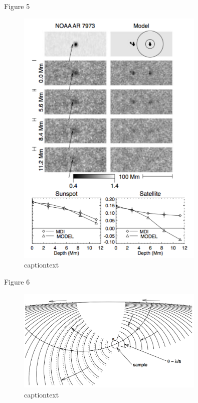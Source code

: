 \documentclass{beamer}
\begin{document}
\begin{frame}{Figure 5}
    \begin{figure}
        \includegraphics[width=0.8\textwidth]{fig_5.png}
        \caption{captiontext}
    \end{figure}
\end{frame}

\begin{frame}{Figure 6}
    \begin{figure}
        \includegraphics[width=0.8\textwidth]{fig_6.png}
        \caption{captiontext}
    \end{figure}
\end{frame}
\end{document}
